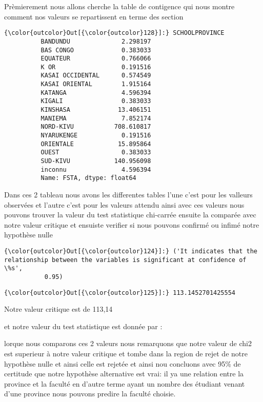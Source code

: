 \documentclass[11pt]{article}
\begin{document}
    Prèmierement nous allons cherche la table de contigence qui nous montre
comment nos valeurs se repartissent en terme des section

            \begin{Verbatim}[commandchars=\\\{\}]
{\color{outcolor}Out[{\color{outcolor}128}]:} SCHOOLPROVINCE
          BANDUNDU              2.298197
          BAS CONGO             0.383033
          EQUATEUR              0.766066
          K OR                  0.191516
          KASAI OCCIDENTAL      0.574549
          KASAI ORIENTAL        1.915164
          KATANGA               4.596394
          KIGALI                0.383033
          KINSHASA             13.406151
          MANIEMA               7.852174
          NORD-KIVU           708.610817
          NYARUKENGE            0.191516
          ORIENTALE            15.895864
          OUEST                 0.383033
          SUD-KIVU            140.956098
          inconnu               4.596394
          Name: FSTA, dtype: float64
\end{Verbatim}
        
    Dans ces 2 tableau nous avons les differentes tables l'une c'est pour
les valleurs observées et l'autre c'est pour les valeurs attendu ainsi
avec ces valeurs nous pouvons trouver la valeur du test statistique
chi-carrée ensuite la comparée avec notre valeur critique et ensuiste
verifier si nous pouvons confirmé ou infimé notre hypothèse nulle

            \begin{Verbatim}[commandchars=\\\{\}]
{\color{outcolor}Out[{\color{outcolor}124}]:} ('It indicates that the relationship between the variables is significant at confidence of \%s',
           0.95)
\end{Verbatim}
        
            \begin{Verbatim}[commandchars=\\\{\}]
{\color{outcolor}Out[{\color{outcolor}125}]:} 113.1452701425554
\end{Verbatim}
        
    Notre valeur critique est de 113,14

    et notre valeur du test statistique est donnée par :

    lorque nous comparons ces 2 valeurs nous remarquons que notre valeur de
chi2 est superieur à notre valeur critique et tombe dans la region de
rejet de notre hypothèse nulle et ainsi celle est rejetée et ainsi nou
concluons avec 95\% de certitude que notre hypothèse alternative est
vrai: il ya une relation entre la province et la faculté en d'autre
terme ayant un nombre des étudiant venant d'une province nous pouvons
predire la faculté choisie.
\end{document}

